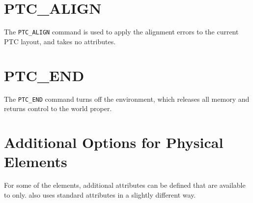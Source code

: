        

\section{PTC\_ALIGN}
\label{sec:ptc_align}

The {\tt PTC\_ALIGN} command is used to apply the \madx alignment
errors to the current PTC layout, and takes no attributes.



\section{PTC\_END}
\label{sec:ptc_end}

The {\tt PTC\_END} command turns off the \ptc environment,
which releases all memory and returns control to the \madx world proper.



\section{Additional Options for Physical Elements}
\label{sec:add_option_PTC}

For some of the \madx elements, additional attributes can be defined
that are available to \ptc only. \ptc also uses standard \madx
attributes in a slightly different way.


